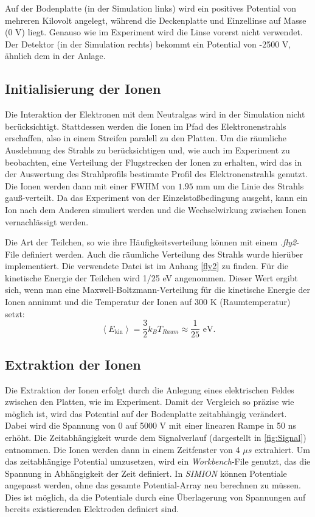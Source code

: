 Auf der Bodenplatte (in der Simulation links) wird ein positives Potential von mehreren Kilovolt angelegt, während die Deckenplatte und Einzellinse auf Masse (0 V) liegt. Genauso wie im Experiment wird die Linse vorerst nicht verwendet. Der Detektor (in der Simulation rechts) bekommt ein Potential von -2500 V, ähnlich dem in der Anlage. 

\subsection{Initialisierung der Ionen}
Die Interaktion der Elektronen mit dem Neutralgas wird in der Simulation nicht berücksichtigt. Stattdessen werden die Ionen im Pfad des Elektronenstrahls erschaffen, also in einem Streifen paralell zu den Platten. Um die räumliche Ausdehnung des Strahls zu berücksichtigen und, wie auch im Experiment zu beobachten, eine Verteilung der Flugstrecken der Ionen zu erhalten, wird das in der Auswertung des Strahlprofils bestimmte Profil des Elektronenstrahls genutzt. Die Ionen werden dann mit einer FWHM von $1.95$ mm um die Linie des Strahls gauß-verteilt. Da das Experiment von der Einzelstoßbedingung ausgeht, kann ein Ion nach dem Anderen simuliert werden und die Wechselwirkung zwischen Ionen vernachlässigt werden.

Die Art der Teilchen, so wie ihre Häufigkeitsverteilung können mit einem \textit{.fly2}-File definiert werden. Auch die räumliche Verteilung des Strahls wurde hierüber implementiert. Die verwendete Datei ist im Anhang \ref{fly2} zu finden. Für die kinetische Energie der Teilchen wird 1/25 eV angenommen. Dieser Wert ergibt sich, wenn man eine Maxwell-Boltzmann-Verteilung für die kinetische 
Energie der Ionen annimmt und die Temperatur der Ionen auf 300 K (Raumtemperatur) setzt: 
\begin{equation}
    \label{eq:kin}
    \left< E_{\text{kin}} \right> = \frac{3}{2} k_B T_{Raum} \approx \frac{1}{25} \text{ eV}.
\end{equation}

\subsection{Extraktion der Ionen}
Die Extraktion der Ionen erfolgt durch die Anlegung eines elektrischen Feldes zwischen den Platten, wie im Experiment. Damit der Vergleich so präzise wie möglich ist, wird das Potential auf der Bodenplatte zeitabhängig verändert. Dabei wird die Spannung von 0 auf 5000 V mit einer linearen Rampe in 50 ns erhöht. Die Zeitabhängigkeit wurde dem Signalverlauf (dargestellt in \ref{fig:Signal}) entnommen. Die Ionen werden dann in einem Zeitfenster von 4 $\mu s$ extrahiert. Um das zeitabhängige Potential umzusetzen, wird ein \textit{Workbench}-File genutzt, das die Spannung in Abhängigkeit der Zeit definiert. In \textit{SIMION} können Potentiale angepasst werden, ohne das gesamte Potential-Array neu berechnen zu müssen. Dies ist möglich, da die Potentiale durch eine Überlagerung von Spannungen auf bereits existierenden Elektroden definiert sind.

